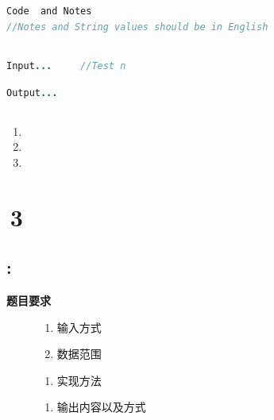 \documentclass{article}
\begin{document}
\subsection{}
\begin{center}
	\begin{lstlisting}[language = Java]
Code  and Notes        
//Notes and String values should be in English
	\end{lstlisting}
\end{center}


\subsection{}
\begin{center}
	\begin{lstlisting}[language = Java]
Input...     //Test n
	\end{lstlisting}
\end{center}

\begin{center}
\begin{lstlisting}[language = Java]
Output...
\end{lstlisting}
\end{center}
\subsection{}
\begin{enumerate}
	\item\kaishu
	\item\kaishu
	\item\kaishu
\end{enumerate}
\newpage


\section{\,3}

\subsection{:}
\noindent\kaishu \textbf{题目要求}
\begin{description}
	\item [\kaishu输入]
	\begin{enumerate}
		\item \kaishu 输入方式
		\item \kaishu 数据范围
	\end{enumerate}
	\item [\kaishu实现]
	\begin{enumerate}
		\item 实现方法
		\end{enumerate}
	\item [\kaishu输出]
	\begin{enumerate}
		\item []\kaishu 输出内容以及方式
	\end{enumerate}
\end{description}
\end{document}
